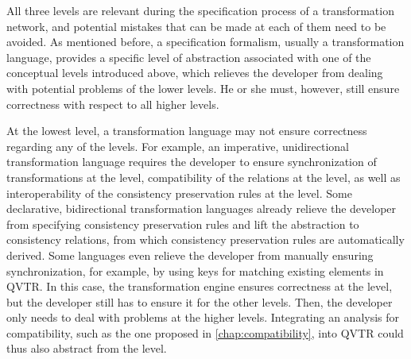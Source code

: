 All three levels are relevant during the specification process of a transformation network, and potential mistakes that can be made at each of them need to be avoided.
As mentioned before, a specification formalism, usually a transformation language, provides a specific level of abstraction associated with one of the conceptual levels introduced above, which relieves the developer from dealing with potential problems of the lower levels.
He or she must, however, still ensure correctness with respect to all higher levels.

At the lowest level, a transformation language may not ensure correctness regarding any of the levels.
For example, an imperative, unidirectional transformation language requires the developer to ensure synchronization of transformations at the \leveltransformation level, compatibility of the relations at the \levelnetworkrelation level, as well as interoperability of the consistency preservation rules at the \levelnetworkrule level.
Some declarative, bidirectional transformation languages already relieve the developer from specifying consistency preservation rules and lift the abstraction to consistency relations, from which consistency preservation rules are automatically derived.
Some languages even relieve the developer from manually ensuring synchronization, for example, by using keys for matching existing elements in \gls{QVTR}.
In this case, the transformation engine ensures correctness at the \leveltransformation level, but the developer still has to ensure it for the other levels.
Then, the developer only needs to deal with problems at the higher levels.
Integrating an analysis for compatibility, such as the one proposed in \autoref{chap:compatibility}, into \gls{QVTR} could thus also abstract from the \levelnetworkrelation level.

